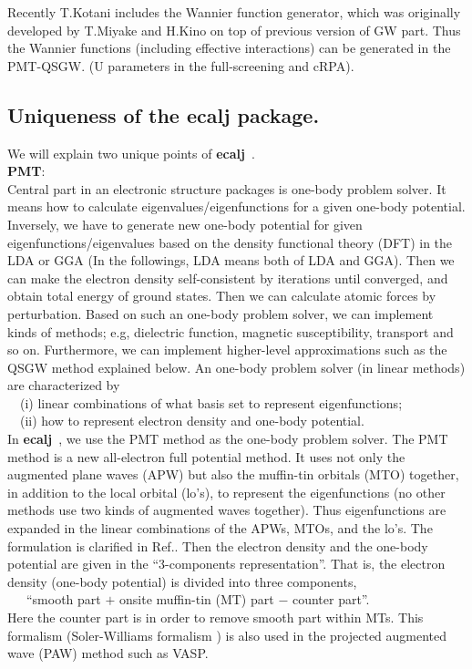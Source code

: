 \documentclass[a4paper,10pt,epsf,fleqn]{article}
\newcommand{\ecalj}{{\bf ecalj}\ }
\begin{document}
Recently T.Kotani includes the Wannier function generator, 
which was originally developed by T.Miyake and H.Kino on top of 
previous version of GW part. Thus the Wannier functions (including
effective interactions) can be generated in the PMT-QSGW.
(U parameters in the full-screening and cRPA).
\vspace{3mm}


\subsection{Uniqueness of the ecalj package.}
\label{sec:fecalj}
We will explain two unique points of \ecalj.\\
{\bf PMT}:\\
Central part in an electronic structure packages is one-body problem solver.
It means how to calculate eigenvalues/eigenfunctions for a
given one-body potential. Inversely, we have to generate new one-body potential 
for given eigenfunctions/eigenvalues
based on the density functional theory (DFT) in the LDA or GGA
(In the followings, LDA means both of LDA and GGA).
Then we can make the electron density self-consistent by iterations
until converged, and obtain total energy of ground states.
Then we can calculate atomic forces by perturbation.
Based on such an one-body problem solver, 
we can implement kinds of methods; e.g, dielectric function, magnetic
susceptibility, transport and so on.
Furthermore, we can implement higher-level approximations 
such as the QSGW method explained below.
An one-body problem solver (in linear methods) are
characterized by \\
\ \ (i) linear combinations of what basis set to represent eigenfunctions; \\
\ \ (ii) how to represent electron density and one-body potential. \\
In \ecalj, we use the PMT method \cite{kotani2015pmt,Kotani2010} as the one-body problem solver.
The PMT method is a new all-electron full potential method. It uses not only the
augmented plane waves (APW) but also the muffin-tin orbitals (MTO) together,
in addition to the local orbital (lo's), to represent the eigenfunctions
(no other methods use two kinds of augmented waves together).
Thus eigenfunctions are expanded in the linear combinations of the
APWs, MTOs, and the lo's.
The formulation is clarified in Ref.\cite{kotani2015pmt}.
Then the electron density and the one-body potential are given
in the ``3-components representation''. 
That is, the electron density 
(one-body potential) is divided into three components, \\
\ \ \ ``smooth part $+$ onsite muffin-tin (MT) part $-$ counter part''. \\
Here the counter part is in order to remove smooth part within MTs.
This formalism (Soler-Williams formalism 
\cite{soler89,soler90}) is also used in 
the projected augmented wave (PAW) method such as VASP.
\end{document}
